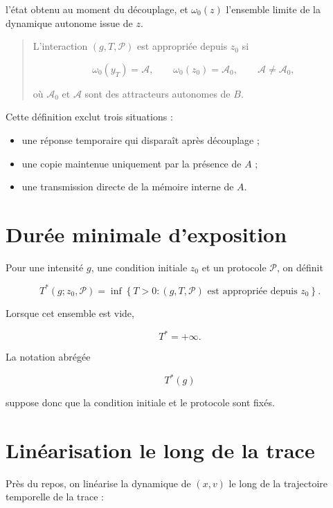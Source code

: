 l'état obtenu au moment du découplage, et \(\omega_0(z)\) l'ensemble
limite de la dynamique autonome issue de \(z\).

\begin{quote}
 L'interaction \((g,T,\mathcal P)\) est appropriée
depuis \(z_0\) si

\[
\omega_0(y_T)=\mathcal A,
\qquad
\omega_0(z_0)=\mathcal A_0,
\qquad
\mathcal A\neq\mathcal A_0,
\]

où \(\mathcal A_0\) et \(\mathcal A\) sont des attracteurs autonomes de
\(B\).
\end{quote}

Cette définition exclut trois situations :

\begin{itemize}
\tightlist
\item
  une réponse temporaire qui disparaît après découplage ;
\item
  une copie maintenue uniquement par la présence de \(A\) ;
\item
  une transmission directe de la mémoire interne de \(A\).
\end{itemize}

\section{Durée minimale d'exposition}
\label{t2-duree-minimale-dexposition}

Pour une intensité \(g\), une condition initiale \(z_0\) et un protocole
\(\mathcal P\), on définit

\[
T^\ast(g;z_0,\mathcal P)
=
\inf
\left\{
T>0 :
(g,T,\mathcal P)
\text{ est appropriée depuis }z_0
\right\}.
\]

Lorsque cet ensemble est vide,

\[
T^\ast=+\infty.
\]

La notation abrégée

\[
T^\ast(g)
\]

suppose donc que la condition initiale et le protocole sont fixés.

\section{Linéarisation le long de la trace}\label{t2-linearisation-le-long-de-la-trace}

Près du repos, on linéarise la dynamique de \((x,v)\) le long de la
trajectoire temporelle de la trace :

